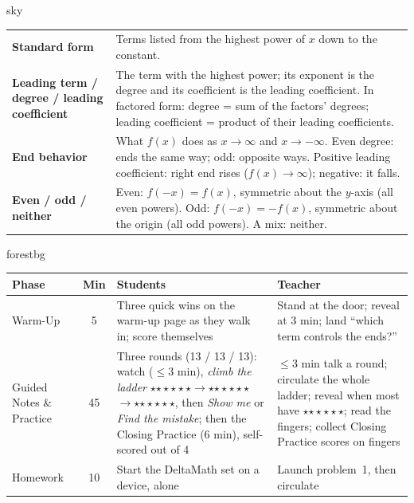 \documentclass[10pt]{article}
\newcommand{\MeetingLength}{60 minutes}
\newcommand{\rung}[1]{{\color{goldacc}\ifcase#1\or$\star$\or$\star\star$\or$\star\star\star$\fi}}
\begin{document}
\begin{skillbox}{sky}
\renewcommand{\arraystretch}{1.3}
\begin{tabularx}{\linewidth}{@{}l X@{}}
\textbf{Standard form} & Terms listed from the highest power of $x$ down to the constant. \\
\textbf{Leading term / degree / leading coefficient} & The term with the highest power; its
      exponent is the degree and its coefficient is the leading coefficient. In factored form:
      degree = sum of the factors' degrees; leading coefficient = product of their leading
      coefficients. \\
\textbf{End behavior} & What $f(x)$ does as $x\to\infty$ and $x\to-\infty$. Even degree: ends
      the same way; odd: opposite ways. Positive leading coefficient: right end rises
      ($f(x)\to\infty$); negative: it falls. \\
\textbf{Even / odd / neither} & Even: $f(-x)=f(x)$, symmetric about the $y$-axis (all even
      powers). Odd: $f(-x)=-f(x)$, symmetric about the origin (all odd powers). A mix: neither. \\
\end{tabularx}
\end{skillbox}

\begin{fixedskillbox}[Lesson at a Glance --- \MeetingLength]{forestbg}
\renewcommand{\arraystretch}{1.25}
\begin{tabularx}{\linewidth}{@{}l c X X@{}}
\textbf{Phase} & \textbf{Min} & \textbf{Students} & \textbf{Teacher} \\
\hline
Warm-Up & 5 & Three quick wins on the warm-up page as they walk in; score themselves & Stand at the door; reveal at 3 min; land ``which term controls the ends?'' \\
Guided Notes \& Practice & 45 & Three rounds (13 / 13 / 13): watch ($\le$3 min), \emph{climb the ladder} \rung1$\to$\rung2$\to$\rung3, then \emph{Show me} or \emph{Find the mistake}; then the Closing Practice (6 min), self-scored out of 4 & $\le$3 min talk a round; circulate the whole ladder; reveal when most have \rung2; read the fingers; collect Closing Practice scores on fingers \\
Homework & 10 & Start the DeltaMath set on a device, alone & Launch problem~1, then circulate \\
\end{tabularx}
\end{fixedskillbox}
\end{document}
